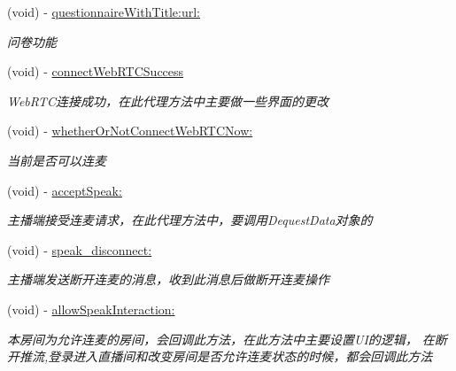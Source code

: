 \begin{DoxyCompactItemize}
\mbox{\label{protocol_request_data_delegate_01-p_a3c4ea01692a2d80ae2858ca52af2885f}} 
(void) -\/ \hyperlink{protocol_request_data_delegate_01-p_a3c4ea01692a2d80ae2858ca52af2885f}{questionnaire\+With\+Title\+:url\+:}
\begin{DoxyCompactList}\small\item\em 问卷功能 \end{DoxyCompactList}\item 
\mbox{\label{protocol_request_data_delegate_01-p_ab774412b2608fff5019294e5cb8798fd}} 
(void) -\/ \hyperlink{protocol_request_data_delegate_01-p_ab774412b2608fff5019294e5cb8798fd}{connect\+Web\+R\+T\+C\+Success}
\begin{DoxyCompactList}\small\item\em Web\+R\+T\+C连接成功，在此代理方法中主要做一些界面的更改 \end{DoxyCompactList}\item 
\mbox{\label{protocol_request_data_delegate_01-p_a014d2b2c0c7db4fa673cf92ad1fcc172}} 
(void) -\/ \hyperlink{protocol_request_data_delegate_01-p_a014d2b2c0c7db4fa673cf92ad1fcc172}{whether\+Or\+Not\+Connect\+Web\+R\+T\+C\+Now\+:}
\begin{DoxyCompactList}\small\item\em 当前是否可以连麦 \end{DoxyCompactList}\item 
(void) -\/ \hyperlink{protocol_request_data_delegate_01-p_a4a3a3f52ad4e761a8957bd8a2c435ecf}{accept\+Speak\+:}
\begin{DoxyCompactList}\small\item\em 主播端接受连麦请求，在此代理方法中，要调用\+Dequest\+Data对象的 \end{DoxyCompactList}\item 
\mbox{\label{protocol_request_data_delegate_01-p_af71dcef6f5c3c586bd9fe2e10f0a4213}} 
(void) -\/ \hyperlink{protocol_request_data_delegate_01-p_af71dcef6f5c3c586bd9fe2e10f0a4213}{speak\+\_\+disconnect\+:}
\begin{DoxyCompactList}\small\item\em 主播端发送断开连麦的消息，收到此消息后做断开连麦操作 \end{DoxyCompactList}\item 
\mbox{\label{protocol_request_data_delegate_01-p_a605105a7b6a4df9b1a9f06fcf44ea492}} 
(void) -\/ \hyperlink{protocol_request_data_delegate_01-p_a605105a7b6a4df9b1a9f06fcf44ea492}{allow\+Speak\+Interaction\+:}
\begin{DoxyCompactList}\small\item\em 本房间为允许连麦的房间，会回调此方法，在此方法中主要设置\+U\+I的逻辑， 在断开推流,登录进入直播间和改变房间是否允许连麦状态的时候，都会回调此方法 \end{DoxyCompactList}\end{DoxyCompactItemize}



